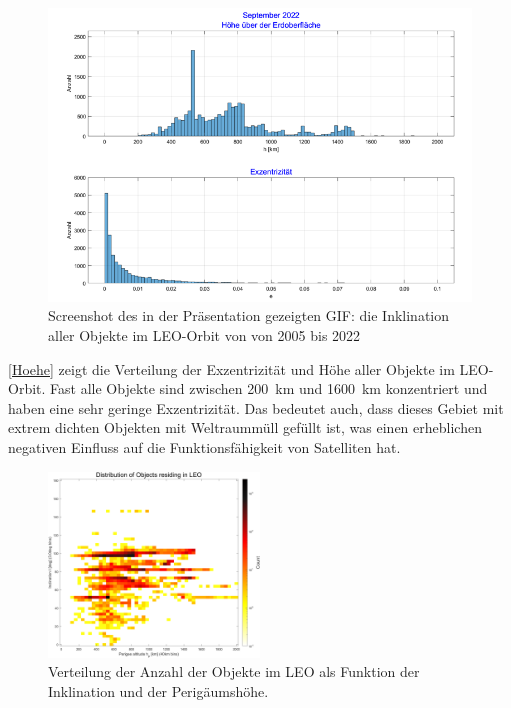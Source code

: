 \documentclass{article}
\begin{document}
\begin{figure}[htbp]
\centering
\includegraphics[width=1\textwidth]{bilder/Hoehe.png}
\caption{Screenshot des in der Präsentation gezeigten GIF: die Inklination aller Objekte im LEO-Orbit von von 2005 bis 2022}
\label{Hoehe}
\end{figure}
\noindent \autoref{Hoehe} zeigt die Verteilung der Exzentrizität und Höhe aller Objekte im LEO-Orbit. Fast alle Objekte sind zwischen \SI{200}{\kilo\meter} und \SI{1600}{\kilo\meter} konzentriert und haben eine sehr geringe Exzentrizität. Das bedeutet auch, dass dieses Gebiet mit extrem dichten Objekten mit Weltraummüll gefüllt ist, was einen erheblichen negativen Einfluss auf die Funktionsfähigkeit von Satelliten hat.
\clearpage
\begin{figure}[htbp]
\centering
\includegraphics[width=0.5\textwidth]{bilder/Distribution_1.png}
\caption{Verteilung der Anzahl der Objekte im LEO als Funktion der Inklination und der Perigäumshöhe.}
\label{Distribution_1}
\end{figure}
\end{document}
